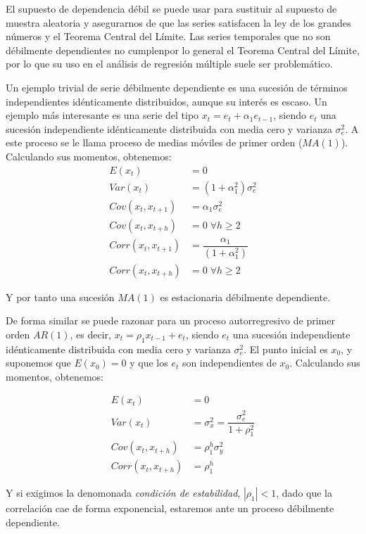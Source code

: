 El supuesto de dependencia d\'ebil se puede usar para sustituir al supuesto de muestra aleatoria y asegurarnos de que las series satisfacen la ley de los grandes n\'umeros y el Teorema Central del L\'imite. Las series temporales que no son d\'ebilmente dependientes no cumplenpor lo general el Teorema Central del L\'imite, por lo que su uso en el an\'alisis de
regresi\'on m\'ultiple suele ser problem\'atico.

Un ejemplo trivial de serie d\'ebilmente dependiente es una sucesi\'on de t\'erminos independientes id\'enticamente distribuidos, aunque su inter\'es es escaso. Un ejemplo m\'as interesante es una serie del tipo $x_t=e_t+\alpha_1e_{t-1}$, siendo $e_t$ una sucesi\'on independiente id\'enticamente distribuida con media cero y varianza $\sigma^2_e$. A este proceso se le llama proceso de medias m\'oviles de primer orden ($MA(1)$). Calculando sus momentos, obtenemos:
\begin{align*}
E(x_t)&=0\\
Var(x_t)&=(1+\alpha_1^2)\sigma^2_e\\
Cov(x_t,x_{t+1})&=\alpha_1\sigma^2_e\\
Cov(x_t,x_{t+h})&=0\;\forall h\geq 2\\
Corr(x_t,x_{t+1})&=\dfrac{\alpha_1}{(1+\alpha_1^2)}\\
Corr(x_t,x_{t+h})&=0\;\forall h\geq 2
\end{align*}

Y por tanto una sucesi\'on $MA(1)$ es estacionaria d\'ebilmente dependiente.

De forma similar se puede razonar para un proceso autorregresivo de primer orden $AR(1)$, es decir, $x_t=\rho_1x_{t-1}+e_t$, siendo $e_t$ una sucesi\'on independiente id\'enticamente distribuida con media cero y varianza $\sigma^2_e$. El punto inicial es $x_0$, y suponemos que $E(x_0)=0$ y que los $e_t$ son independientes de $x_0$. Calculando sus momentos, obtenemos:

\begin{align*}
E(x_t)&=0\\
Var(x_t)&=\sigma_x^2=\dfrac{\sigma^2_e}{1+\rho_1^2}\\
Cov(x_t,x_{t+h})&=\rho_1^h\sigma_y^2\\
Corr(x_t,x_{t+h})&=\rho_1^h
\end{align*}

Y si exigimos la denomonada \textit{condici\'on de estabilidad}, $|\rho_1|<1$, dado que la correlaci\'on cae de forma exponencial, estaremos ante un proceso d\'ebilmente dependiente.


